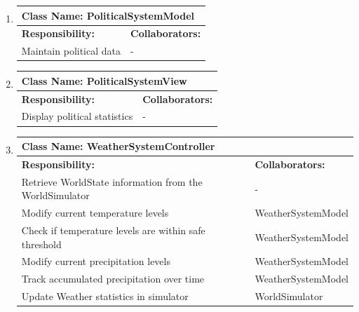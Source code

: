 \documentclass[]{article}
\begin{document}
\begin{enumerate}[1.]
\begin{tabular}{|p{10cm}|p{4cm}|}
	    \hline
	  \end{tabular}

	\item
	\begin{tabular}{|p{10cm}|p{4cm}|}
	    \hline
	     \multicolumn{2}{|l|}{\textbf{Class Name:  PoliticalSystemModel}} \\
	    \hline
	    \textbf{Responsibility:} & \textbf{Collaborators:} \\
	    \hline
			Maintain political data & - \\

	    \hline
	  \end{tabular}

	\item
	\begin{tabular}{|p{10cm}|p{4cm}|}
	    \hline
	     \multicolumn{2}{|l|}{\textbf{Class Name:  PoliticalSystemView}} \\
	    \hline
	    \textbf{Responsibility:} & \textbf{Collaborators:} \\
	    \hline
			Display political statistics & - \\

	    \hline
	  \end{tabular}

	\item
	\begin{tabular}{|p{10cm}|p{4cm}|}
	    \hline
	     \multicolumn{2}{|l|}{\textbf{Class Name:  WeatherSystemController}} \\
	    \hline
	    \textbf{Responsibility:} & \textbf{Collaborators:} \\
			\hline
			Retrieve WorldState information from the WorldSimulator & - \\
	    Modify current temperature levels & WeatherSystemModel \\
			Check if temperature levels are within safe threshold & WeatherSystemModel \\
			Modify current precipitation levels & WeatherSystemModel \\
			Track accumulated precipitation over time & WeatherSystemModel \\
			Update Weather statistics in simulator & WorldSimulator \\

	    \hline
	  \end{tabular}


\end{enumerate}
\end{document}
